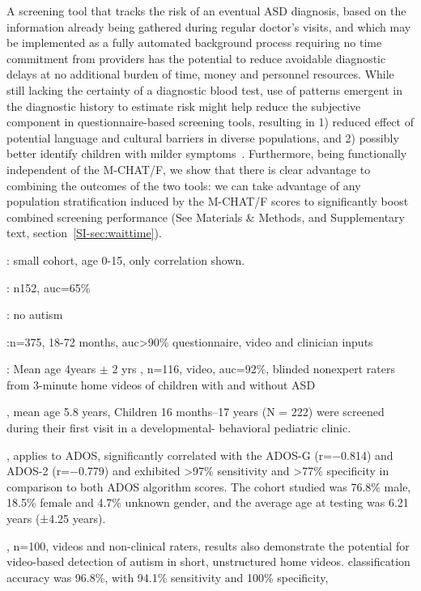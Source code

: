 \documentclass[3p,super,numbers,sort&compress,10pt]{elsarticle}
\begin{document}
A  screening  tool that tracks the risk of an eventual ASD diagnosis,  based  on the information already being gathered during regular doctor's visits, and which may be implemented as a  fully automated background process requiring no time commitment from providers has the potential to reduce avoidable diagnostic  delays at no additional burden of time, money and personnel resources.  While still lacking the certainty of a diagnostic blood test,  use of patterns emergent in  the diagnostic history to estimate risk might help reduce the subjective component in questionnaire-based screening tools, resulting in 1) reduced effect of potential language and cultural barriers in diverse populations, and 2) possibly better identify children with milder symptoms~\cite{hyman2020identification}.
Furthermore, being functionally independent of the M-CHAT/F, we show that there is clear advantage to combining the outcomes of the two tools: we can take advantage of any population stratification induced by the M-CHAT/F scores to significantly boost combined screening performance (See Materials \&  Methods, and Supplementary text, section~\ref{SI-sec:waittime}).
 


\cite{doshi2014comorbidity}: small cohort, age 0-15, only correlation shown.

\cite{lingren2016electronic}: n152, auc=65\%

\cite{pmid27185194}: no autism

\cite{abbas2020multi}:n=375, 18-72 months, auc>90\% questionnaire, video and clinician inputs

\cite{tariq2018mobile}: Mean age 4years $\pm$ 2 yrs , n=116, video, auc=92\%, blinded nonexpert raters from 3-minute home videos of children with and without ASD 

\cite{duda2016clinical}, mean age 5.8 years, Children 16 months–17 years (N = 222)
were screened during their first visit in a developmental-
behavioral pediatric clinic.

\cite{duda2014testing}, applies to ADOS, significantly correlated with the ADOS-G (r=−0.814) and ADOS-2 (r=−0.779) and exhibited >97\% sensitivity and >77\% specificity in comparison to both ADOS algorithm scores. The cohort studied was 76.8\% male, 18.5\% female and 4.7\% unknown gender, and the average age at testing was 6.21 years (±4.25 years).


\cite{fusaro2014potential}, n=100, videos and non-clinical raters, results also demonstrate the potential for video-based detection of autism in short, unstructured home videos. classification accuracy was 96.8\%, with 94.1\% sensitivity and 100\% specificity, 
\end{document}
